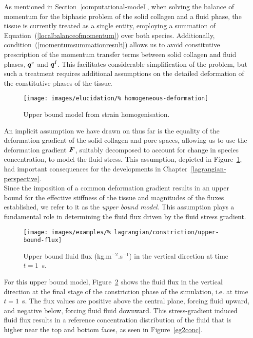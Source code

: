 As mentioned in Section~\ref{computational-model}, when solving the
balance of momentum for the biphasic problem of the solid collagen and
a fluid phase, the tissue is currently treated as a single entity,
employing a summation of Equation~(\ref{localbalanceofmomentum}) over
both species. Additionally, condition~(\ref{momentumsummationresult})
allows us to avoid constitutive prescription of the momentum transfer
terms between solid collagen and fluid phases, $\mbox{\boldmath$ q$}^\mathrm{c}$ and
$\mbox{\boldmath$ q$}^\mathrm{f}$. This facilitates considerable simplification of the
problem, but such a treatment requires additional assumptions on the
detailed deformation of the constitutive phases of the tissue.

\begin{figure}[!hpt]
  \centering
  \texttt{[image: images/elucidation/\%
    homogeneous-deformation]}
  \caption{Upper bound model from strain homogenisation.}
  \label{upper-bound-model}
\end{figure}

An implicit assumption we have drawn on thus far is the equality of
the deformation gradient of the solid collagen and pore spaces,
allowing us to use the deformation gradient $\mbox{\boldmath$ F$}$, suitably decomposed
to account for change in species concentration, to model the fluid
stress. This assumption, depicted in Figure~\ref{upper-bound-model},
had important consequences for the developments in
Chapter~\ref{lagrangian-perspective}.\\ %

Since the imposition of a common deformation gradient results in an
upper bound for the effective stiffness of the tissue and magnitudes
of the fluxes established, we refer to it as the {\em upper bound
  model}. This assumption plays a fundamental role in determining the
fluid flux driven by the fluid stress gradient.

\begin{figure}[!t]
  \centering
  \texttt{[image: images/examples/\%
    lagrangian/constriction/upper-bound-flux]}
  \caption{Upper bound fluid flux (kg.m$^{-2}$.s$^{-1}$) in
    the vertical direction at time $t=1$~s.}
  \label{eg2flux}
\end{figure}

\noindent For this upper bound model, Figure~\ref{eg2flux} shows the
fluid flux in the vertical direction at the final stage of the
constriction phase of the simulation, i.e. at time $t=1$~s. The flux
values are positive above the central plane, forcing fluid upward, and
negative below, forcing fluid fluid downward. This stress-gradient
induced fluid flux results in a reference concentration distribution
of the fluid that is higher near the top and bottom faces, as seen in
Figure~\ref{eg2conc}.

